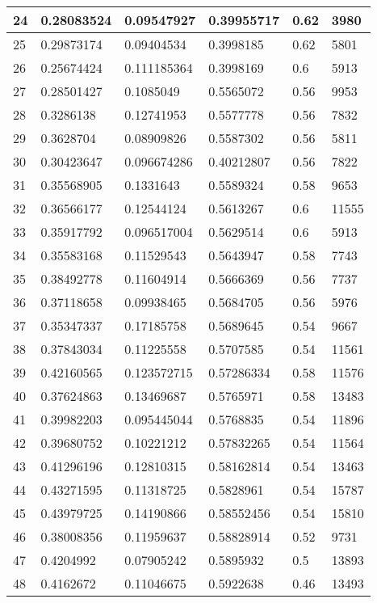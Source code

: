 \begin{longtable}{|l|l|l|l|l|l|}
24 & 0.28083524 & 0.09547927 & 0.39955717 & 0.62 & 3980 \\ \hline 
25 & 0.29873174 & 0.09404534 & 0.3998185 & 0.62 & 5801 \\ \hline 
26 & 0.25674424 & 0.111185364 & 0.3998169 & 0.6 & 5913 \\ \hline 
27 & 0.28501427 & 0.1085049 & 0.5565072 & 0.56 & 9953 \\ \hline 
28 & 0.3286138 & 0.12741953 & 0.5577778 & 0.56 & 7832 \\ \hline 
29 & 0.3628704 & 0.08909826 & 0.5587302 & 0.56 & 5811 \\ \hline 
30 & 0.30423647 & 0.096674286 & 0.40212807 & 0.56 & 7822 \\ \hline 
31 & 0.35568905 & 0.1331643 & 0.5589324 & 0.58 & 9653 \\ \hline 
32 & 0.36566177 & 0.12544124 & 0.5613267 & 0.6 & 11555 \\ \hline 
33 & 0.35917792 & 0.096517004 & 0.5629514 & 0.6 & 5913 \\ \hline 
34 & 0.35583168 & 0.11529543 & 0.5643947 & 0.58 & 7743 \\ \hline 
35 & 0.38492778 & 0.11604914 & 0.5666369 & 0.56 & 7737 \\ \hline 
36 & 0.37118658 & 0.09938465 & 0.5684705 & 0.56 & 5976 \\ \hline 
37 & 0.35347337 & 0.17185758 & 0.5689645 & 0.54 & 9667 \\ \hline 
38 & 0.37843034 & 0.11225558 & 0.5707585 & 0.54 & 11561 \\ \hline 
39 & 0.42160565 & 0.123572715 & 0.57286334 & 0.58 & 11576 \\ \hline 
40 & 0.37624863 & 0.13469687 & 0.5765971 & 0.58 & 13483 \\ \hline 
41 & 0.39982203 & 0.095445044 & 0.5768835 & 0.54 & 11896 \\ \hline 
42 & 0.39680752 & 0.10221212 & 0.57832265 & 0.54 & 11564 \\ \hline 
43 & 0.41296196 & 0.12810315 & 0.58162814 & 0.54 & 13463 \\ \hline 
44 & 0.43271595 & 0.11318725 & 0.5828961 & 0.54 & 15787 \\ \hline 
45 & 0.43979725 & 0.14190866 & 0.58552456 & 0.54 & 15810 \\ \hline 
46 & 0.38008356 & 0.11959637 & 0.58828914 & 0.52 & 9731 \\ \hline 
47 & 0.4204992 & 0.07905242 & 0.5895932 & 0.5 & 13893 \\ \hline 
48 & 0.4162672 & 0.11046675 & 0.5922638 & 0.46 & 13493 \\ \hline 

\end{longtable}
